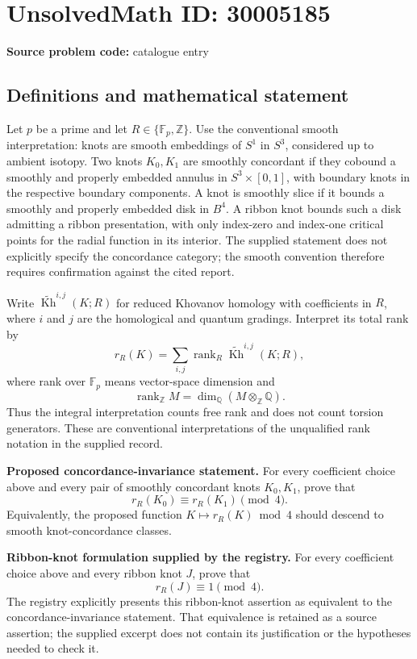 \documentclass[11pt]{article}
\begin{document}
\section*{UnsolvedMath ID: 30005185}
\textbf{Source problem code:} catalogue entry
\subsection{Definitions and mathematical statement}
Let \(p\) be a prime and let \(R\in\{\mathbb F_p,\mathbb Z\}\). Use the conventional smooth interpretation: knots are smooth embeddings of \(S^1\) in \(S^3\), considered up to ambient isotopy. Two knots \(K_0,K_1\) are smoothly concordant if they cobound a smoothly and properly embedded annulus in \(S^3\times[0,1]\), with boundary knots in the respective boundary components. A knot is smoothly slice if it bounds a smoothly and properly embedded disk in \(B^4\). A ribbon knot bounds such a disk admitting a ribbon presentation, with only index-zero and index-one critical points for the radial function in its interior. The supplied statement does not explicitly specify the concordance category; the smooth convention therefore requires confirmation against the cited report.

Write \(\widetilde{\operatorname{Kh}}^{i,j}(K;R)\) for reduced Khovanov homology with coefficients in \(R\), where \(i\) and \(j\) are the homological and quantum gradings. Interpret its total rank by
\[
 r_R(K)=\sum_{i,j}\operatorname{rank}_R\widetilde{\operatorname{Kh}}^{i,j}(K;R),
\]
where rank over \(\mathbb F_p\) means vector-space dimension and
\[
 \operatorname{rank}_{\mathbb Z}M=\dim_{\mathbb Q}(M\otimes_{\mathbb Z}\mathbb Q).
\]
Thus the integral interpretation counts free rank and does not count torsion generators. These are conventional interpretations of the unqualified rank notation in the supplied record.

\textbf{Proposed concordance-invariance statement.} For every coefficient choice above and every pair of smoothly concordant knots \(K_0,K_1\), prove that
\[
 r_R(K_0)\equiv r_R(K_1)\pmod 4.
\]
Equivalently, the proposed function \(K\mapsto r_R(K)\bmod 4\) should descend to smooth knot-concordance classes.

\textbf{Ribbon-knot formulation supplied by the registry.} For every coefficient choice above and every ribbon knot \(J\), prove that
\[
 r_R(J)\equiv 1\pmod 4.
\]
The registry explicitly presents this ribbon-knot assertion as equivalent to the concordance-invariance statement. That equivalence is retained as a source assertion; the supplied excerpt does not contain its justification or the hypotheses needed to check it.
\end{document}
